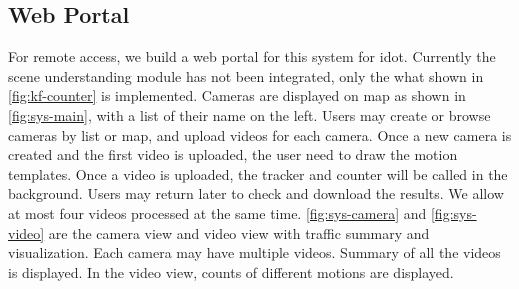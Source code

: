 \subsection{Web Portal}
For remote access, we build a web portal for this system for \gls{idot}. Currently the scene understanding module has not been integrated, only the what shown in \ref{fig:kf-counter} is implemented.
Cameras are displayed on map as shown in \ref{fig:sys-main}, with a list of their name on the left. Users may create or browse cameras by list or map, and upload videos for each camera. Once a new camera is created and the first video is uploaded, the user need to draw the motion templates.
Once a video is uploaded, the tracker and counter will be called in the background. Users may return later to check and download the results. We allow at most four videos processed at the same time. 
\ref{fig:sys-camera} and \ref{fig:sys-video} are the camera view and video view with traffic summary and visualization. 
Each camera may have multiple videos. Summary of all the videos is displayed. In the video view, counts of different motions are displayed.

